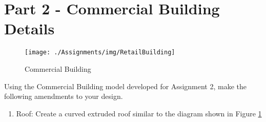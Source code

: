 \newpage

\section*{Part 2 - Commercial Building Details}

\begin{figure}
	\centering
	\texttt{[image: ./Assignments/img/RetailBuilding]}
	\caption{Commercial Building}
	\label{fig:retailbuilding}
\end{figure}



Using the Commercial Building model developed for Assignment 2, make the following amendments to your design. 

\begin{enumerate}
	\item Roof: Create a curved extruded roof similar to the diagram shown in Figure \ref{fig:retailbuilding}
	

\end{enumerate}

